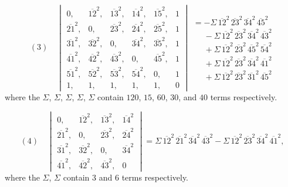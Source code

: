 \documentclass[11pt]{article}
\begin{document}
\[ (3)\quad \begin{vmatrix}
0, & \overline{12}^{2}, & \overline{13}^{2}, & \overline{14}^{2}, & \overline{15}^{2}, & 1 \\
\overline{21}^{2}, & 0, & \overline{23}^{2}, & \overline{24}^{2}, & \overline{25}^{2}, & 1 \\
\overline{31}^{2}, & \overline{32}^{2}, & 0, & \overline{34}^{2}, & \overline{35}^{2}, & 1 \\
\overline{41}^{2}, & \overline{42}^{2}, & \overline{43}^{2}, & 0, & \overline{45}^{2}, & 1 \\
\overline{51}^{2}, & \overline{52}^{2}, & \overline{53}^{2}, & \overline{54}^{2}, & 0, & 1 \\
1, & 1, & 1, & 1, & 1, & 0
\end{vmatrix}
\begin{array}{l}
=-\Sigma\, \overline{12}^{2}\, \overline{23}^{2}\, \overline{34}^{2}\, \overline{45}^{2}\\
\phantom{=}-\Sigma\, \overline{12}^{2}\, \overline{23}^{2}\, \overline{34}^{2}\, \overline{43}^{2}\\
\phantom{=}+\Sigma\, \overline{12}^{2}\, \overline{23}^{2}\, \overline{45}^{2}\, \overline{54}^{2}\\
\phantom{=}+\Sigma\, \overline{12}^{2}\, \overline{23}^{2}\, \overline{34}^{2}\, \overline{41}^{2}\\
\phantom{=}+\Sigma\, \overline{12}^{2}\, \overline{23}^{2}\, \overline{31}^{2}\, \overline{45}^{2}
\end{array} \]
where the $\Sigma$, $\Sigma$, $\Sigma$, $\Sigma$, $\Sigma$ contain $120$, $15$, $60$, $30$, and $40$ terms respectively.

\[ (4)\quad \begin{vmatrix}
0, & \overline{12}^{2}, & \overline{13}^{2}, & \overline{14}^{2} \\
\overline{21}^{2}, & 0, & \overline{23}^{2}, & \overline{24}^{2} \\
\overline{31}^{2}, & \overline{32}^{2}, & 0, & \overline{34}^{2} \\
\overline{41}^{2}, & \overline{42}^{2}, & \overline{43}^{2}, & 0
\end{vmatrix} = \Sigma\, \overline{12}^{2}\, \overline{21}^{2}\, \overline{34}^{2}\, \overline{43}^{2}
- \Sigma\, \overline{12}^{2}\, \overline{23}^{2}\, \overline{34}^{2}\, \overline{41}^{2}, \]
where the $\Sigma$, $\Sigma$ contain $3$ and $6$ terms respectively.
\end{document}
